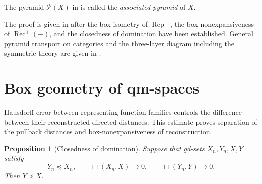 \documentclass{amsart}
\theoremstyle{plain}
\newtheorem{proposition}[theorem]{Proposition}
\theoremstyle{definition}
\theoremstyle{remark}
\begin{document}
The pyramid $\mathcal P(X)$ in  is called the \emph{associated pyramid} of $X$.

The proof is given in  after the box-isometry of $\operatorname{Rep}^{+}$, the box-nonexpansiveness of $\operatorname{Rec}^{+}(-)$, and the closedness of domination have been established. General pyramid transport on categories and the three-layer diagram including the symmetric theory are given in .
\section{Box geometry of qm-spaces}
\label{sec:preliminaries}

Hausdorff error between representing function families controls the difference between their reconstructed directed distances. This estimate proves separation of the pullback distances and box-nonexpansiveness of reconstruction.

\begin{proposition}[Closedness of domination]
\label{prop:domination-box-closedness}
Suppose that gd-sets $X_n,Y_n,X,Y$ satisfy
\[
Y_n\preceq X_n,\qquad
\Box(X_n,X)\longrightarrow0,\qquad
\Box(Y_n,Y)\longrightarrow0.
\]
Then $Y\preceq X$.
\end{proposition}
\end{document}
